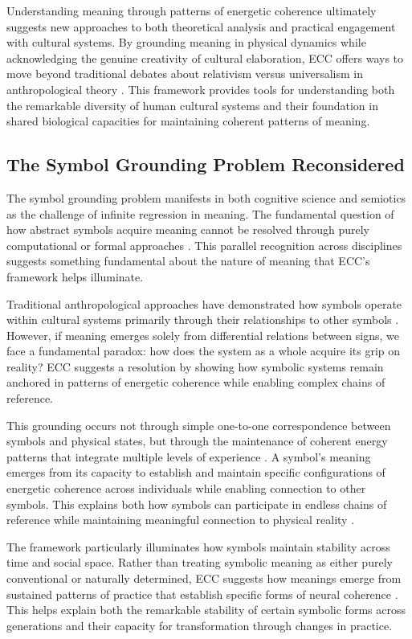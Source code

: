 \begin{refsection}
Understanding meaning through patterns of energetic coherence ultimately suggests new approaches to both theoretical analysis and practical engagement with cultural systems. By grounding meaning in physical dynamics while acknowledging the genuine creativity of cultural elaboration, ECC offers ways to move beyond traditional debates about relativism versus universalism in anthropological theory \cite{wolf1999envisioning}. This framework provides tools for understanding both the remarkable diversity of human cultural systems and their foundation in shared biological capacities for maintaining coherent patterns of meaning.

\subsection{The Symbol Grounding Problem Reconsidered}

The symbol grounding problem manifests in both cognitive science and semiotics as the challenge of infinite regression in meaning. The fundamental question of how abstract symbols acquire meaning cannot be resolved through purely computational or formal approaches \cite{harnad1990symbol}. This parallel recognition across disciplines suggests something fundamental about the nature of meaning that ECC's framework helps illuminate.

Traditional anthropological approaches have demonstrated how symbols operate within cultural systems primarily through their relationships to other symbols \cite{saussure1983course}. However, if meaning emerges solely from differential relations between signs, we face a fundamental paradox: how does the system as a whole acquire its grip on reality? ECC suggests a resolution by showing how symbolic systems remain anchored in patterns of energetic coherence while enabling complex chains of reference.

This grounding occurs not through simple one-to-one correspondence between symbols and physical states, but through the maintenance of coherent energy patterns that integrate multiple levels of experience \cite{lakoff1999philosophy}. A symbol's meaning emerges from its capacity to establish and maintain specific configurations of energetic coherence across individuals while enabling connection to other symbols. This explains both how symbols can participate in endless chains of reference while maintaining meaningful connection to physical reality \cite{peirce1931collected}.

The framework particularly illuminates how symbols maintain stability across time and social space. Rather than treating symbolic meaning as either purely conventional or naturally determined, ECC suggests how meanings emerge from sustained patterns of practice that establish specific forms of neural coherence \cite{barsalou1999perceptual}. This helps explain both the remarkable stability of certain symbolic forms across generations and their capacity for transformation through changes in practice.


\end{refsection}
